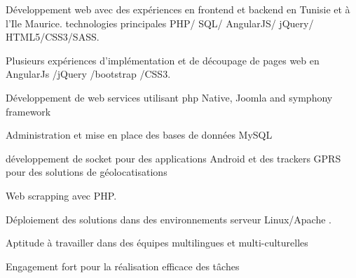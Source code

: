 \begin{cventries}
  \cventry
    {}
    {}
    {}
    {}
    {
      \begin{cvitems}
        \item {Développement  web avec des expériences en frontend et backend en Tunisie et à l'Ile Maurice. technologies principales  PHP/ SQL/ AngularJS/ jQuery/ HTML5/CSS3/SASS.}
        \item {Plusieurs expériences d'implémentation et de découpage de pages web en  AngularJs /jQuery /bootstrap /CSS3.}        
        \item {Développement de web services  utilisant php Native, Joomla and symphony framework}
        \item {Administration et mise en place des bases de données MySQL}
        \item {développement de socket pour des applications Android et des trackers GPRS pour des solutions de géolocatisations} \item {Web scrapping avec PHP.}   
        \item {Déploiement des solutions dans des environnements serveur Linux/Apache .} 
        \item {Aptitude à travailler dans des équipes multilingues et multi-culturelles} 
        \item {Engagement fort pour la réalisation efficace des tâches}         
      \end{cvitems}
    }
\end{cventries}